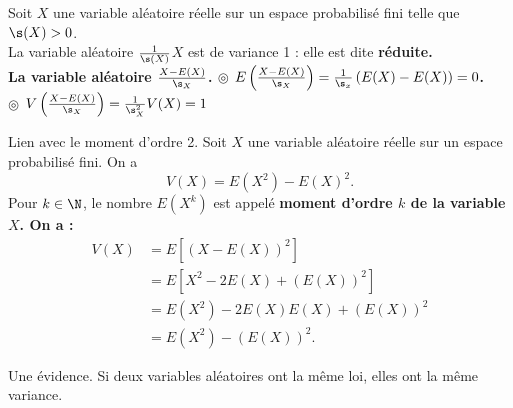 \documentclass[11pt]{article}
\begin{document}
\begin{prop}{}{}
    Soit $X$ une variable aléatoire réelle sur un espace probabilisé fini telle que $\s(X)>0$.\\
    La variable aléatoire \Large$\frac{1}{\s(X)}$\normalsize$X$ est de variance 1 : elle est dite \bf{réduite}.\\
    La variable aléatoire \LARGE$\frac{X-E(X)}{\s_X}$\normalsize.
    \tcblower
    \Large$\circledcirc$ $E\left(\frac{X-E(X)}{\s_X}\right)=\frac{1}{\s_x}\left( E(X) - E(X) \right) = 0$.\\
    $\circledcirc$ $V\left( \frac{X-E(X)}{\s_X} \right) = \frac{1}{\s_X^2}V(X)=1$
\end{prop}

\begin{prop}{Lien avec le moment d'ordre 2.}{}
    Soit $X$ une variable aléatoire réelle sur un espace probabilisé fini. On a
    \begin{equation*}
        V(X)=E(X^2)-E(X)^2.
    \end{equation*}
    Pour $k\in\N$, le nombre $E(X^k)$ est appelé \bf{moment} d'ordre $k$ de la variable $X$.
    \tcblower
    On a :
    \begin{align*}
        V(X)&=E\left[ (X-E(X))^2 \right]\\
        &= E\left[ X^2 - 2E(X) + (E(X))^2 \right]\\
        &= E(X^2) - 2E(X)E(X) + (E(X))^2\\
        &= E(X^2) - (E(X))^2.
    \end{align*}
\end{prop}

\begin{prop}{Une évidence.}{}
    Si deux variables aléatoires ont la même loi, elles ont la même variance.
\end{prop}
\end{document}
